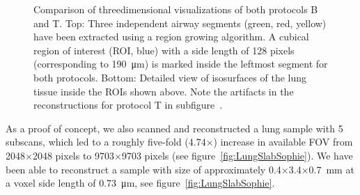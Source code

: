 \begin{figure}[htp]
{%
		}%
	\caption{Comparison of threedimensional visualizations of both protocols B and T. Top: Three independent airway segments (green, red, yellow) have been extracted using a region growing algorithm. A cubical region of interest (ROI, blue) with a side length of 128 pixels (corresponding to \SI{190}{\micro\meter}) is marked inside the leftmost segment for both protocols. Bottom: Detailed view of isosurfaces of the lung tissue inside the ROIs shown above. Note the artifacts in the reconstructions for protocol T in subfigure~.}%
	\label{fig:BvsT2}
\end{figure}
\cbend

As a proof of concept, we also scanned and reconstructed a lung sample with 5 subscans, which led to a roughly five-fold (4.74\(\times\)) increase in available FOV from 2048\(\times\)2048 pixels to 9703\(\times\)9703 pixels (see figure~\ref{fig:LungSlabSophie}). We have been able to reconstruct a sample with size of approximately 0.4\(\times\)3.4\(\times\)\SI{0.7}{\milli\meter} at a voxel side length of \SI{0.73}{\micro\meter}, see figure~\ref{fig:LungSlabSophie}.

